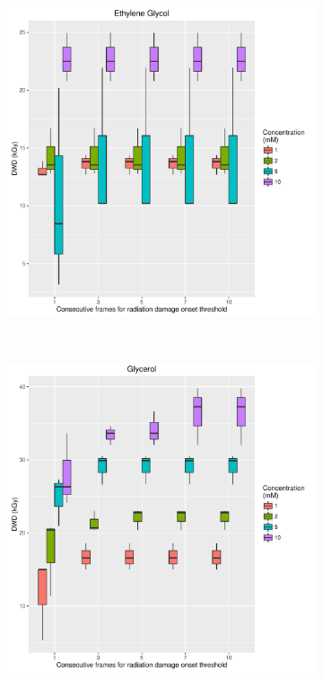 \begin{figure}
    \centering
    \begin{subfigure}[b]{0.75\textwidth}
            \centering
            \includegraphics[width=\textwidth]{figures/saxs/Ethylene_Glycol_Num_consec_fr_comp.pdf}
            \caption{}
            \label{}
    \end{subfigure}
    \\
    \begin{subfigure}[b]{0.75\textwidth}
            \centering
            \includegraphics[width=\textwidth]{figures/saxs/Glycerol_Num_consec_fr_comp.pdf}
            \caption{}
            \label{}
    \end{subfigure}
\end{figure}

